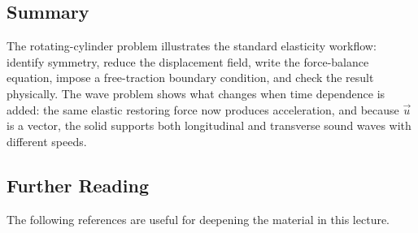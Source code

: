 \documentclass[../main.tex]{subfiles}
\begin{document}
\subsection*{Summary}

The rotating-cylinder problem illustrates the standard elasticity workflow: identify symmetry, reduce the displacement field, write the force-balance equation, impose a free-traction boundary condition, and check the result physically. The wave problem shows what changes when time dependence is added: the same elastic restoring force now produces acceleration, and because $\vec{u}$ is a vector, the solid supports both longitudinal and transverse sound waves with different speeds.

\subsection*{Further Reading}

The following references are useful for deepening the material in this lecture.
\end{document}
